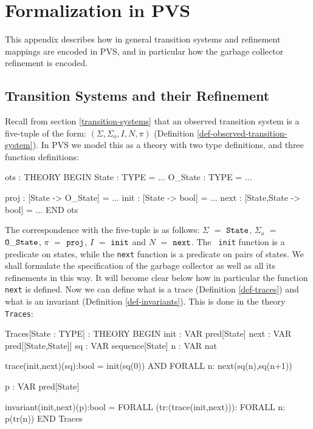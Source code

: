           
\section{Formalization in PVS}
\label{pvs-specifications}

This  appendix   describes   how in  general  transition   systems  and
refinement mappings   are encoded in  PVS,  and in particular  how the
garbage collector refinement is encoded.  


\subsection{Transition Systems and their Refinement}

Recall     from  section  \ref{transition-systems}    that an observed
transition   system      is    a      five-tuple   of     the    form:
$(\Sigma,\Sigma_o,I,N,\pi)$                                (Definition
\ref{def-observed-transition-system})\@. In PVS  we  model this as a  theory
with two type definitions, and  three function definitions:

\begin{smallsession}
ots : THEORY
BEGIN
  State   : TYPE = ...
  O_State : TYPE = ...

  proj : [State -> O_State] = ...
  init : [State -> bool] = ...
  next : [State,State -> bool] = ...
END ots
\end{smallsession}

The  correspondence with the   five-tuple is as follows: $\Sigma$  $=$
${\tt  State}$,  $\Sigma_o$  $=$  ${\tt O\_State}$,   $\pi$  $=$ ${\tt
  proj}$, $I$ $=$ ${\tt  init}$ and $N$  $=$  ${\tt next}$.  The  {\tt
  init} function  is  a predicate  on  states,  while the  {\tt  next}
function  is a predicate on  pairs of states.   We shall formulate the
specification of the garbage collector  as well as all its refinements
in this  way.   It  will become clear   below how  in   particular the
function {\tt  next} is defined.   Now we can  define  what is a trace
(Definition \ref{def-traces}) and what   is an  invariant  (Definition
\ref{def-invariants})\@.   This is  done in  the theory  {\tt Traces}:

\begin{smallsession}
Traces[State : TYPE] : THEORY
BEGIN
  init : VAR pred[State]
  next : VAR pred[[State,State]]
  sq   : VAR sequence[State]
  n    : VAR nat

  trace(init,next)(sq):bool =
    init(sq(0)) AND
    FORALL n: next(sq(n),sq(n+1))

  p  : VAR pred[State]

  invariant(init,next)(p):bool =
    FORALL (tr:(trace(init,next))): FORALL n: p(tr(n))
END Traces
\end{smallsession}
\label{pvs-traces}

